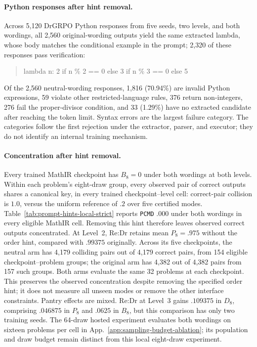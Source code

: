 \documentclass{article}
\newcommand{\1}{\mathbf 1}
\newcommand{\pmd}{\texttt{PCMD}}
\theoremstyle{remark}
\theoremstyle{definition}
\theoremstyle{plain}
\begin{document}
\paragraph{Python responses after hint removal.}
Across 5,120 DrGRPO Python responses from five seeds, two levels, and both
wordings, all 2,560 original-wording outputs yield the same extracted lambda,
whose body matches the conditional example in the prompt; 2,320 of these
responses pass verification:
\begin{quote}\footnotesize\ttfamily
lambda n: 2 if n \% 2 == 0 else 3 if n \% 3 == 0 else 5
\end{quote}
Of the 2,560 neutral-wording responses, 1,816 (70.94\%) are invalid Python
expressions, 59 violate other restricted-language rules, 376 return
non-integers, 276 fail the proper-divisor condition, and 33 (1.29\%) have
no extracted candidate after reaching the token limit. Syntax errors are
the largest failure category. The categories follow the first rejection
under the extractor, parser, and executor; they do not identify an internal
training mechanism.

\paragraph{Concentration after hint removal.}
Every trained MathIR checkpoint has $B_8=0$ under both wordings at both levels.
Within each problem's eight-draw group, every observed pair of correct
outputs shares a canonical key, in every trained checkpoint--level cell:
correct-pair collision is $1.0$, versus the
uniform reference of $.2$ over five certified modes.
Table~\ref{tab:prompt-hints-local-strict} reports \pmd{} $.000$ under both
wordings in every eligible MathIR cell. Removing this hint therefore leaves
observed correct outputs concentrated. At Level~2, Re:Dr retains mean $P_8=.975$ without the order hint, compared with $.99375$
originally. Across its five checkpoints, the neutral arm has 4,179 colliding
pairs out of 4,179 correct pairs, from 154 eligible checkpoint--problem
groups; the original arm has 4,382 out of 4,382 pairs from 157 such groups.
Both arms evaluate the same 32 problems at each checkpoint. This preserves
the observed concentration despite removing the specified order hint; it does
not measure all unseen modes or remove the other interface constraints.
Pantry effects are mixed. Re:Dr at Level~3 gains $.109375$ in $D_8$,
comprising $.046875$ in $P_8$ and $.0625$ in $B_8$, but this comparison has only
two training seeds. The 64-draw hosted experiment evaluates both wordings on sixteen problems
per cell in
App.~\ref{app:sampling-budget-ablation}; its population and draw budget
remain distinct from this local eight-draw experiment.
\end{document}
